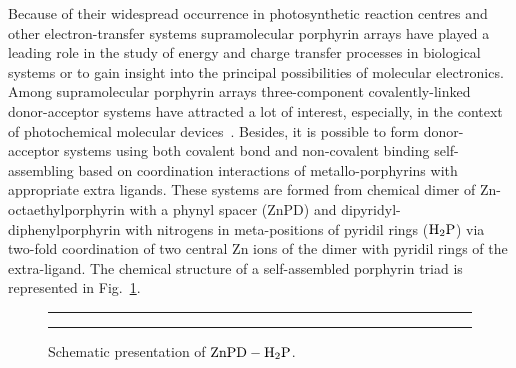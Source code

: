 \documentclass[12pt,twoside,a4paper]{report}
\begin{document}
Because of their widespread occurrence in photosynthetic reaction centres 
and other electron-transfer systems supramolecular porphyrin arrays have 
played a leading role in the study of energy and charge transfer processes 
in biological systems 
\cite{bio-sys1,bio-sys2,bio-sys3,bio-sys4,bio-sys5,bio-sys6} 
or to gain insight into the 
principal possibilities of molecular electronics\cite{mol-elec}. Among 
supramolecular porphyrin arrays three-component covalently-linked 
donor-acceptor  systems \cite{triad1,triad2} have attracted a 
lot of interest, especially, in the context of photochemical molecular 
devices~\cite{PMD1,PMD2}. 
%
%
%
Besides, it is possible to form donor-acceptor systems
using both
     covalent bond 
     and 
     non-covalent binding self-assembling
based on
     coordination interactions
     of metallo-porphyrins
     with appropriate extra ligands\cite{exp96,will98,NCLD}.
%
%
These systems are formed 
from 
chemical dimer of Zn-octaethylporphyrin with a phynyl spacer (ZnPD) and 
dipyridyl-diphenylporphyrin
with nitrogens in meta-positions of pyridil rings (${\rm H_2P}$)
via
two-fold coordination
of two central Zn ions of the dimer with pyridil rings of the extra-ligand.
The chemical structure of 
a self-assembled 
porphyrin triad
is represented in Fig.~\ref{chemical-structure}.  
\begin{footnotesize}\begin{figure}[!h] 
\centering 
\parbox{5cm}{\rule{-2cm}{0cm}\epsfxsize=7cm 
}
\parbox{5cm}{\rule{1cm}{0cm}\epsfxsize=7cm 
}
\caption[Schematic presentation of ${\rm ZnPD-H_2P}$]
{\small 
\label{chemical-structure}
Schematic presentation of ${\rm ZnPD-H_2P}$.}
\end{figure}\end{footnotesize} 
\end{document}
